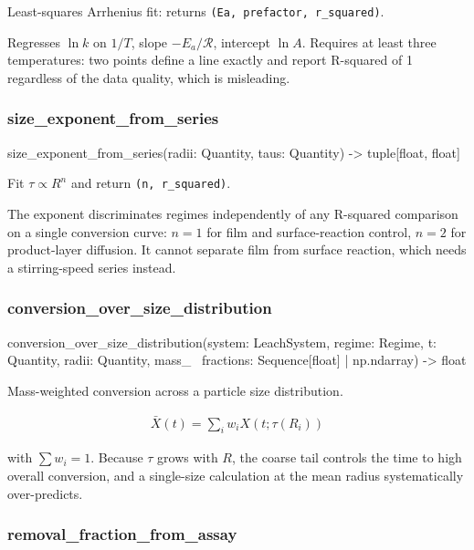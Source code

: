 \documentclass[10pt,a4paper,twoside]{report}
\begin{document}
Least-squares Arrhenius fit: returns \texttt{(Ea, prefactor, r\_squared)}.

Regresses $\ln k$ on $1/T$, slope $-E_a/\mathcal{R}$, intercept $\ln A$. Requires at least three temperatures: two points define a line exactly and report R-squared of 1 regardless of the data quality, which is misleading.

\subsubsection*{size\_exponent\_from\_series}

\begin{verbatimsmall}
size_exponent_from_series(radii: Quantity, taus: Quantity) -> tuple[float, float]
\end{verbatimsmall}

Fit $\tau \propto R^n$ and return \texttt{(n, r\_squared)}.

The exponent discriminates regimes independently of any R-squared comparison on a single conversion curve: $n = 1$ for film and surface-reaction control, $n = 2$ for product-layer diffusion. It cannot separate film from surface reaction, which needs a stirring-speed series instead.

\subsubsection*{conversion\_over\_size\_distribution}

\begin{verbatimsmall}
conversion_over_size_distribution(system: LeachSystem, regime: Regime, t: Quantity, radii: Quantity, mass_
    \ fractions: Sequence[float] | np.ndarray) -> float
\end{verbatimsmall}

Mass-weighted conversion across a particle size distribution.

\begin{equation*}
\begin{gathered}
\bar{X}(t) = \sum_i w_i X\!\left(t; \tau(R_i)\right)
\end{gathered}
\end{equation*}

with $\sum w_i = 1$. Because $\tau$ grows with $R$, the coarse tail controls the time to high overall conversion, and a single-size calculation at the mean radius systematically over-predicts.

\subsubsection*{removal\_fraction\_from\_assay}
\end{document}
